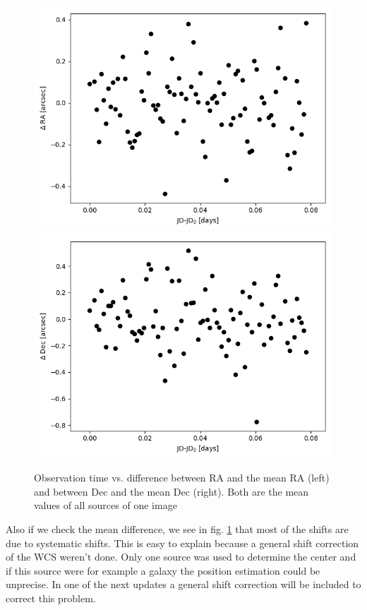 \begin{figure}
	\includegraphics[width=0.475\linewidth]{./img/jd_delta_ra_all.png}
	\includegraphics[width=0.475\linewidth]{./img/jd_delta_dec_all.png}
	\caption{Observation time vs. difference between RA and the mean RA (left) and between Dec and the mean Dec (right). Both are the mean values of all sources of one image}
	\label{fig: mean_coordiantes_diff}
\end{figure}
Also if we check the mean difference, we see in fig. \ref{fig: mean_coordiantes_diff} that most of the shifts are due to systematic shifts. This is easy to explain because a general shift correction of the WCS weren't done. Only one source was used to determine the center and if this source were for example a galaxy the position estimation could be unprecise. In one of the next updates a general shift correction will be included to correct this problem.